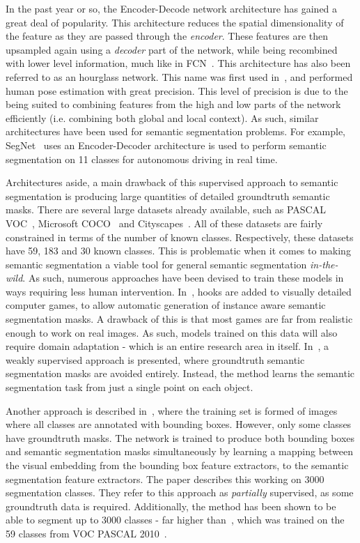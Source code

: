 In the past year or so, the Encoder-Decode network architecture has
gained a great deal of popularity. This architecture reduces the
spatial dimensionality of the feature as they are passed through the
\textit{encoder}. These features are then upsampled again using a
\textit{decoder} part of the network, while being recombined with
lower level information, much like in FCN~\cite{long2015fully}. This
architecture has also been referred to as an hourglass network. This
name was first used in~\cite{newell2016stacked}, and performed human
pose estimation with great precision. This level of precision is due
to the being suited to combining features from the high and low parts
of the network efficiently (i.e. combining both global and local
context). As such, similar architectures have been used for semantic
segmentation problems. For example,
SegNet~\cite{badrinarayanan2017segnet} uses an Encoder-Decoder
architecture is used to perform semantic segmentation on 11 classes
for autonomous driving in real time.

Architectures aside, a main drawback of this supervised approach to
semantic segmentation is producing large quantities of detailed
groundtruth semantic masks. There are several large datasets already
available, such as PASCAL VOC~\cite{everingham2010pascal}, Microsoft
COCO~\cite{lin2014microsoft} and
Cityscapes~\cite{cordts2016cityscapes}. All of these datasets are
fairly constrained in terms of the number of known
classes. Respectively, these datasets have 59, 183 and 30 known
classes. This is problematic when it comes to making semantic
segmentation a viable tool for general semantic segmentation
\textit{in-the-wild}. As such, numerous approaches have been devised
to train these models in ways requiring less human
intervention. In~\cite{richter2016playing}, hooks are added to
visually detailed computer games, to allow automatic generation of
instance aware semantic segmentation masks. A drawback of this is that
most games are far from realistic enough to work on real images. As
such, models trained on this data will also require domain adaptation
- which is an entire research area in itself. In~\cite{bearman2016s},
a weakly supervised approach is presented, where groundtruth semantic
segmentation masks are avoided entirely. Instead, the method learns
the semantic segmentation task from just a single point on each
object.

Another approach is described in~\cite{hu2018learning}, where the
training set is formed of images where all classes are annotated with
bounding boxes. However, only some classes have groundtruth masks. The
network is trained to produce both bounding boxes and semantic
segmentation masks simultaneously by learning a mapping between the
visual embedding from the bounding box feature extractors, to the
semantic segmentation feature extractors. The paper describes this
working on 3000 segmentation classes. They refer to this approach as
\textit{partially} supervised, as some groundtruth data is
required. Additionally, the method has been shown to be able to
segment up to 3000 classes - far higher than~\cite{long2015fully},
which was trained on the 59 classes from VOC PASCAL
2010~\cite{everingham2010pascal}.

